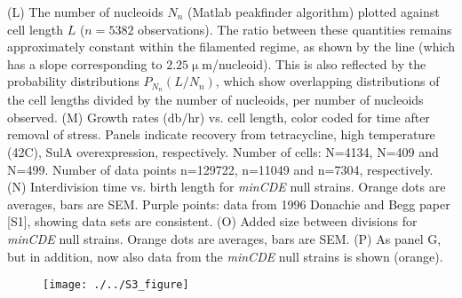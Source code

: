 \documentclass[]{article}
\begin{document}
{(L) The number of nucleoids $N_n$ (Matlab peakfinder algorithm) plotted against cell length $L$ ($n = 5382$ observations). The ratio between these quantities remains approximately constant within the filamented regime, as shown by the line (which has a slope corresponding to $2.25 \upmu$m/nucleoid). This is also reflected by the probability distributions $P_{N_n}(L/N_n)$, which show overlapping distributions of the cell lengths divided by the number of nucleoids, per number of nucleoids observed. 
(M) Growth rates (db/hr) vs. cell length, color coded for time after removal of stress. Panels indicate recovery from tetracycline, high temperature (42C), SulA overexpression, respectively. Number of cells: N=4134, N=409 and N=499. Number of data points n=129722, n=11049 and n=7304, respectively. 
(N) Interdivision time vs. birth length for \textit{minCDE} null strains. Orange dots are averages, bars are SEM. Purple points: data from 1996 Donachie and Begg paper [S1], showing data sets are consistent.
(O) Added size between divisions for \textit{minCDE} null strains. Orange dots are averages, bars are SEM. 
(P) As panel G, but in addition, now also data from the \textit{minCDE} null strains is shown (orange).}




\begin{figure}
	\centering
	\texttt{[image: ./../S3\_figure]}
\end{figure}	
\clearpage
{}
\end{document}
